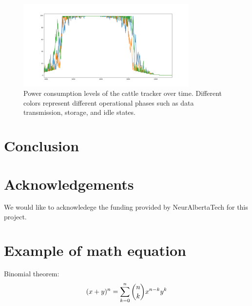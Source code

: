 \documentclass[10pt]{cai}
\begin{document}
\begin{figure}[htbp]
    \centering
    \includegraphics[width=0.8\textwidth]{./figs/power_levels.png}
    \caption{Power consumption levels of the cattle tracker over time. Different colors represent different operational phases such as data transmission, storage, and idle states.}
    \label{fig:power_levels}
\end{figure}


\section{Conclusion}


\section*{Acknowledgements}
We would like to acknowledege the funding provided by NeurAlbertaTech for this project.

\appendix

\section{Example of math equation }
Binomial theorem: \cite{hribarUsingDeepQLearning2019}
\begin{equation}
(x+y)^n=\sum_{\substack{k=0}}^{n}\dbinom{n}{k}x^{n-k}y^k
\end{equation}


\printbibliography[heading=subbibintoc]
\end{document}

